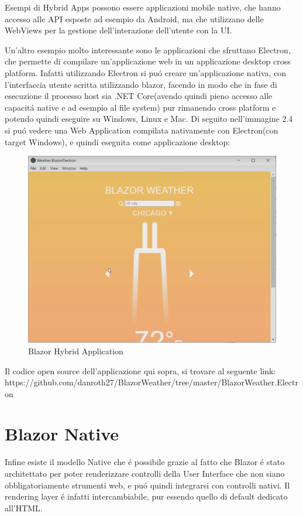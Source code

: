 Esempi di Hybrid Apps possono essere applicazioni mobile native, che hanno accesso alle API esposte ad esempio da Android, ma che utilizzano delle WebViews per la gestione dell'interazione dell'utente con la UI.

Un'altro esempio molto interessante sono le applicazioni che sfruttano Electron, che permette di compilare un'applicazione web in un applicazione desktop cross platform.
Infatti utilizzando Electron si pu\'o creare un'applicazione nativa, con l'interfaccia utente scritta utilizzando blazor, facendo in modo che in fase di esecuzione il processo host sia .NET Core(avendo quindi pieno accesso alle capacit\'a native e ad esempio al file system) pur rimanendo cross platform e potendo quindi eseguire su Windows, Linux e Mac.
Di seguito nell'immagine 2.4 si pu\'o vedere una Web Application compilata nativamente con Electron(con target Windows), e quindi eseguita come applicazione desktop:

\begin{figure}[H]
	\centerline{\includegraphics[scale=0.6]{figure/BlazorWeatherElectron.png}}
	\caption{Blazor Hybrid Application}
	\label{fig:BlazorHybridApplication}
\end{figure}

Il codice open source dell'applicazione qui sopra, si trovare al seguente link: https://github.com/danroth27/BlazorWeather/tree/master/BlazorWeather.Electron
\pagebreak



\section{Blazor Native}\label{sez:bnative}
Infine esiste il modello Native che \'e possibile grazie al fatto che Blazor \'e stato architettato per poter renderizzare controlli della User Interface che non siano obbligatoriamente strumenti web, e pu\'o quindi integrarsi con controlli nativi.
Il rendering layer \'e infatti intercambiabile, pur essendo quello di default dedicato all'HTML.

